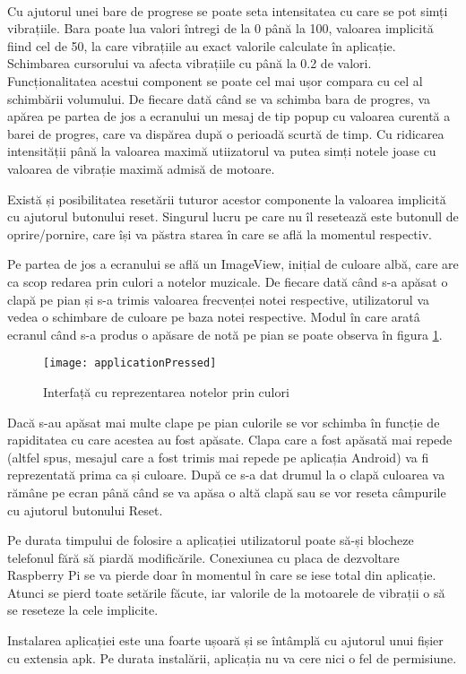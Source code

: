 \documentclass[../IoMusT.tex]{subfiles}
\begin{document}
\\
\par Cu ajutorul unei bare de progrese se poate seta intensitatea cu care se pot simți vibrațiile. Bara poate lua valori întregi de la 0 până la 100, va\-loa\-rea implicită fiind cel de 50, la care vibrațiile au exact valorile calculate în aplicație. Schimbarea cursorului va afecta vibrațiile cu
 până la 0.2 de valori. Funcționalitatea acestui component se poate cel mai ușor compara cu cel al schimbării volumului. De fiecare dată când se va schimba bara de progres, va apărea pe partea de jos a ecranului un mesaj de tip popup cu valoarea curentă a barei de progres, care va dispărea după o perioadă scurtă de timp. Cu ridicarea intensității până la valoarea maximă utiizatorul va putea simți notele joase cu valoarea de vibrație maximă admisă de motoare.
\\
\par Există și posibilitatea resetării tuturor acestor componente la valoarea implicită cu ajutorul butonului reset. Singurul lucru pe care nu îl resetează este butonull de oprire/pornire, care își va păstra starea în care se află la momentul respectiv.
\\
\par Pe partea de jos a ecranului se află un ImageView, inițial de culoare albă, care are ca scop redarea prin culori a notelor muzicale. De fiecare dată când s-a apăsat o clapă pe pian și s-a trimis valoarea frecvenței notei respective, utilizatorul va vedea o schimbare de culoare pe baza notei respective. Modul în care aratâ ecranul când s-a produs o apăsare de notă pe pian se poate observa în figura \ref{fig:applicationPressed}.
\begin{figure}[h]
\begin{center}
\texttt{[image: applicationPressed]}
\caption{Interfață cu reprezentarea notelor prin culori}
\label{fig:applicationPressed}
\end{center}
\end{figure}
Dacă s-au apăsat mai multe clape pe pian culorile se vor schimba în funcție de rapiditatea cu care acestea au fost apăsate. Clapa care a fost apăsată mai repede (altfel spus, mesajul care a fost trimis mai repede pe aplicația Android) va fi reprezentată prima ca și culoare. După ce s-a dat drumul la o clapă culoarea va rămâne pe ecran până când se va apăsa o altă clapă sau se vor reseta câmpurile cu ajutorul butonului Reset.
\\
\par Pe durata timpului de folosire a aplicației utilizatorul poate să-și blocheze telefonul fără să piardă modificările. Conexiunea cu placa de dezvoltare Raspberry Pi se va pierde doar în momentul în care se iese total din aplicație. Atunci se pierd toate setările făcute, iar valorile de la motoarele de vibrații o să se reseteze la cele implicite.
\\
\par Instalarea aplicației este una foarte ușoară și se întâmplă cu ajutorul unui fișier cu extensia apk. Pe durata instalării, aplicația nu va cere nici o fel de permisiune.
\end{document}
